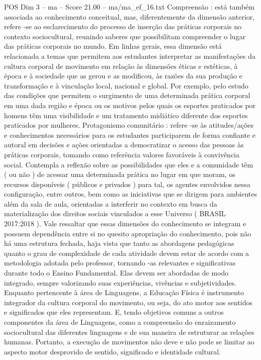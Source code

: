 \begin{textsample}{POS Dim 3 – ma – Score 21.00 – ma/ma\_ef\_16.txt}
Compreensão : está também associada ao conhecimento conceitual, mas, diferentemente da dimensão anterior, refere -se ao esclarecimento do processo de inserção das práticas corporais no contexto sociocultural, reunindo saberes que possibilitam compreender o lugar das práticas corporais no mundo.
Em linhas gerais, essa dimensão está relacionada a temas que permitem aos estudantes interpretar as manifestações da cultura corporal de movimento em relação às dimensões éticas e estéticas, à época e à sociedade que as gerou e as modificou, às razões da sua produção e transformação e à vinculação local, nacional e global.
Por exemplo, pelo estudo das condições que permitem o surgimento de uma determinada prática corporal em uma dada região e época ou os motivos pelos quais os esportes praticados por homens têm uma visibilidade e um tratamento midiático diferente dos esportes praticados por mulheres.
Protagonismo comunitário : refere -se às atitudes/ações e conhecimentos necessários para os estudantes participarem de forma confiante e autoral em decisões e ações orientadas a democratizar o acesso das pessoas às práticas corporais, tomando como referência valores favoráveis à convivência social.
Contempla a reflexão sobre as possibilidades que eles e a comunidade têm ( ou não ) de acessar uma determinada prática no lugar em que moram, os recursos disponíveis ( públicos e privados ) para tal, os agentes envolvidos nessa configuração, entre outros, bem como as iniciativas que se dirigem para ambientes além da sala de aula, orientadas a interferir no contexto em busca da materialização dos direitos sociais vinculados a esse Universo ( BRASIL 2017:2018 ).
Vale ressaltar que essas dimensões do conhecimento se integram e possuem dependência entre si no quesito apropriação do conhecimento, pois não há uma estrutura fechada, haja vista que tanto as abordagens pedagógicas quanto o grau de complexidade de cada atividade devem estar de acordo com a metodologia adotada pelo professor, tornando -as relevantes e significativas durante todo o Ensino Fundamental.
Elas devem ser abordadas de modo integrado, sempre valorizando suas experiências, vivências e subjetividades.
Enquanto pertencente à área de Linguagens, a Educação Física é instrumento integrador da cultura corporal do movimento, ou seja, do ato motor aos sentidos e significados que eles representam.
E, tendo objetivos comuns a outros componentes da área de Linguagens, como a compreensão do enraizamento sociocultural das diferentes linguagens e de sua maneira de estruturar as relações humanas.
Portanto, a execução de movimentos não deve e não pode se limitar ao aspecto motor desprovido de sentido, significado e identidade cultural.

\end{textsample}
